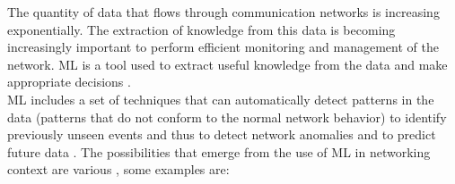 The quantity of data that flows through communication networks is increasing exponentially. The extraction of knowledge from this data is becoming increasingly important to perform efficient monitoring and management of the network. ML is a tool used to extract useful knowledge from the data and make appropriate decisions \cite{sara_2018:ml_cognitive_network_management,Mowei_2017:ml_Workflow,stampa_2017:DL_optimization}.\\

ML includes a set of techniques that can automatically detect patterns in the data (patterns that do not conform to the normal network behavior) to identify previously unseen events and thus to detect network anomalies and to predict future data \cite{murphy_2012:ml_probabilistic,bishop_2006:pattern_recognition}. The possibilities that emerge from the use of ML in networking context are various \cite{Boutaba2018}, some examples are:

